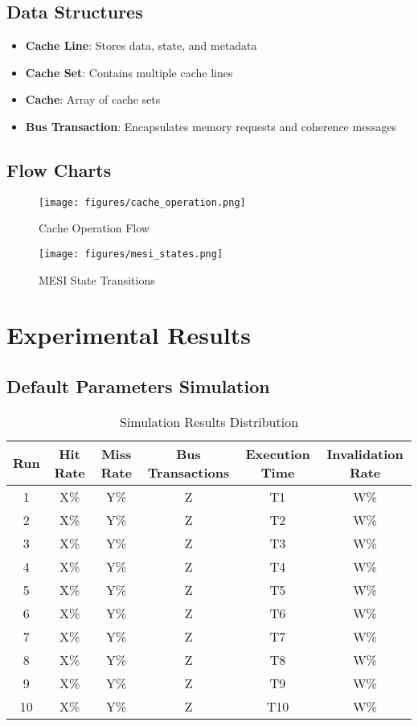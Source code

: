 \documentclass{article}
\begin{document}
\subsection{Data Structures}
\begin{itemize}
    \item \textbf{Cache Line}: Stores data, state, and metadata
    \item \textbf{Cache Set}: Contains multiple cache lines
    \item \textbf{Cache}: Array of cache sets
    \item \textbf{Bus Transaction}: Encapsulates memory requests and coherence messages
\end{itemize}

\subsection{Flow Charts}
\begin{figure}[H]
    \centering
    \texttt{[image: figures/cache\_operation.png]}
    \caption{Cache Operation Flow}
\end{figure}

\begin{figure}[H]
    \centering
    \texttt{[image: figures/mesi\_states.png]}
    \caption{MESI State Transitions}
\end{figure}

\section{Experimental Results}

\subsection{Default Parameters Simulation}
\begin{table}[H]
    \centering
    \begin{tabular}{|c|c|c|c|c|c|}
        \hline
        Run & Hit Rate & Miss Rate & Bus Transactions & Execution Time & Invalidation Rate \\
        \hline
        1 & X\% & Y\% & Z & T1 & W\% \\
        2 & X\% & Y\% & Z & T2 & W\% \\
        3 & X\% & Y\% & Z & T3 & W\% \\
        4 & X\% & Y\% & Z & T4 & W\% \\
        5 & X\% & Y\% & Z & T5 & W\% \\
        6 & X\% & Y\% & Z & T6 & W\% \\
        7 & X\% & Y\% & Z & T7 & W\% \\
        8 & X\% & Y\% & Z & T8 & W\% \\
        9 & X\% & Y\% & Z & T9 & W\% \\
        10 & X\% & Y\% & Z & T10 & W\% \\
        \hline
    \end{tabular}
    \caption{Simulation Results Distribution}
\end{table}
\end{document}
